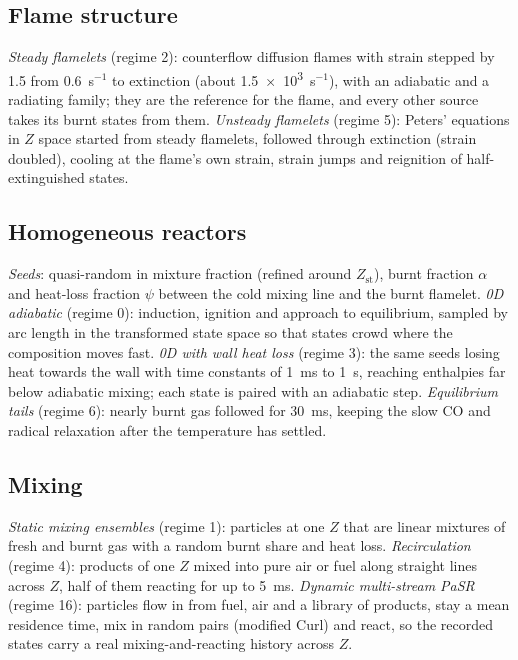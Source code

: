 \documentclass[preprint,review,12pt]{elsarticle}
\begin{document}
\subsection{Flame structure}
\emph{Steady flamelets} (regime 2): counterflow diffusion flames with strain stepped by 1.5 from 0.6~s$^{-1}$ to
extinction (about \num{1.5e3}~s$^{-1}$), with an adiabatic and a radiating family; they are the reference for the
flame, and every other source takes its burnt states from them. \emph{Unsteady flamelets} (regime 5): Peters'
equations in $Z$ space started from steady flamelets, followed through extinction (strain doubled), cooling at
the flame's own strain, strain jumps and reignition of half-extinguished states.

\subsection{Homogeneous reactors}
\emph{Seeds}: quasi-random in mixture fraction (refined around $Z_\mathrm{st}$), burnt fraction $\alpha$ and heat-loss
fraction $\psi$ between the cold mixing line and the burnt flamelet. \emph{0D adiabatic} (regime 0): induction,
ignition and approach to equilibrium, sampled by arc length in the transformed state space so that states crowd
where the composition moves fast. \emph{0D with wall heat loss} (regime 3): the same seeds losing heat towards the
wall with time constants of 1~ms to 1~s, reaching enthalpies far below adiabatic mixing; each state is paired with an
adiabatic step. \emph{Equilibrium tails} (regime 6): nearly burnt gas followed for 30~ms, keeping the slow CO and
radical relaxation after the temperature has settled.

\subsection{Mixing}
\emph{Static mixing ensembles} (regime 1): particles at one $Z$ that are linear mixtures of fresh and burnt gas
with a random burnt share and heat loss. \emph{Recirculation} (regime 4): products of one $Z$ mixed into pure air or
fuel along straight lines across $Z$, half of them reacting for up to 5~ms. \emph{Dynamic multi-stream PaSR}
(regime 16): particles flow in from fuel, air and a library of products, stay a mean residence time, mix in random
pairs (modified Curl) and react, so the recorded states carry a real mixing-and-reacting history across $Z$.
\end{document}
